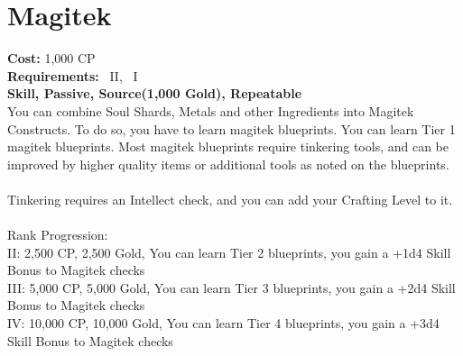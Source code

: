 \section{Magitek}\label{perk:magitek}
\textbf{Cost:} 1,000 CP\\
\textbf{Requirements:}~ II,~ I\\
\textbf{Skill, Passive, Source(1,000 Gold), Repeatable}\\
You can combine Soul Shards, Metals and other Ingredients into Magitek Constructs.
To do so, you have to learn magitek blueprints.
You can learn Tier 1 magitek blueprints.
Most magitek blueprints require tinkering tools, and can be improved by higher quality items or additional tools as noted on the blueprints.\\
\\
Tinkering requires an Intellect check, and you can add your Crafting Level to it.\\
\\
Rank Progression:\\
II: 2,500 CP, 2,500 Gold, You can learn Tier 2 blueprints, you gain a +1d4 Skill Bonus to Magitek checks\\
III: 5,000 CP, 5,000 Gold, You can learn Tier 3 blueprints, you gain a +2d4 Skill Bonus to Magitek checks\\
IV: 10,000 CP, 10,000 Gold, You can learn Tier 4 blueprints, you gain a +3d4 Skill Bonus to Magitek checks\\